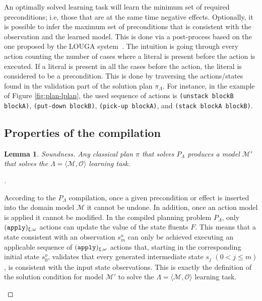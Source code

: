 \documentclass[runningheads]{llncs}
\newcommand{\tup}[1]{{\langle #1 \rangle}}
\newtheorem{mylemma}[mytheorem]{Lemma}
\begin{document}
An optimally solved learning task will learn the minimum set of required preconditions; i.e, those that are at the same time negative effects. Optionally, it is possible to infer the maximum set of preconditions that is consistent with the observation and the learned model. This is done via a post-process based on the one proposed by the {\sc LOUGA} system~\cite{kuvcera2018louga}. The intuition is going through every action counting the number of cases where a literal is present before the action is executed. If a literal is present in all the cases before the action, the literal is considered to be a precondition. This is done by traversing the actions/states found in the validation part of the solution plan $\pi_\Lambda$. For instance, in the example of Figure \ref{fig:plan-lplan}, the used sequence of actions is {\tt\small(unstack blockB blockA)}, {\tt\small(put-down blockB)}, {\tt\small(pick-up blockA)}, and {\tt\small(stack blockA blockB)}.

\subsection{Properties of the compilation}
\begin{mylemma}
Soundness. Any classical plan $\pi$ that solves $P_{\Lambda}$ produces a model $\mathcal{M'}$ that solves the $\Lambda=\tup{\mathcal{M},{\mathcal O}}$ learning task.
\end{mylemma}

\begin{proof}[]
\begin{small}
According to the $P_{\Lambda}$ compilation, once a given precondition or effect is inserted into the domain model $\mathcal{M}$ it cannot be undone. In addition, once an action model is applied it cannot be modified. In the compiled planning problem $P_{\Lambda}$, only ${\tt \small (apply)_{\xi,\omega}}$ actions can update the value of the state fluents $F$. This means that a state consistent with an observation $s_m^o$ can only be achieved executing an applicable sequence of ${\tt \small (apply)_{\xi,\omega}}$ actions that, starting in the corresponding initial state $s_0^o$, validates that every generated intermediate state $s_j$ $(0 < j\leq m)$, is consistent with the input state observations. This is exactly the definition of the solution condition for model $\mathcal{M}'$ to solve the $\Lambda=\tup{\mathcal{M},{\mathcal O}}$ learning task.
\end{small}
\end{proof}
\end{document}
